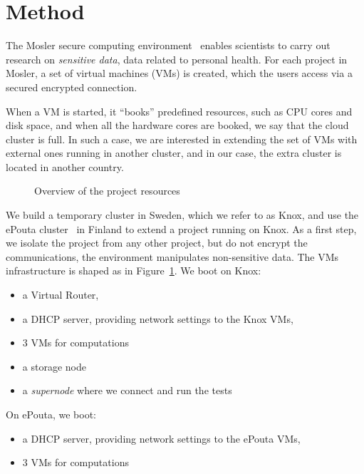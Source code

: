 \section{Method}
\label{section:method}

The Mosler secure computing environment~\cite{mosler} enables
scientists to carry out research on \emph{sensitive data}, \eg data
related to personal health.
%
For each project in Mosler, a set of virtual machines (VMs) is
created, which the users access via a secured encrypted connection.

When a VM is started, it ``books'' predefined resources, such as CPU
cores and disk space, and when all the hardware cores are booked, we
say that the cloud cluster is full. In such a case, we are interested
in extending the set of VMs with external ones running in another
cluster, and in our case, the extra cluster is located in another
country.

\begin{figure}[!b]
  \centering
  
  \caption{Overview of the project resources}
  \label{figure:overview}
\end{figure}

We build a temporary cluster in Sweden, which we refer to as Knox, and
use the ePouta cluster~\cite{epouta} in Finland to extend a project
running on Knox. As a first step, we isolate the project from any
other project, but do not encrypt the communications, \ie the
environment manipulates non-sensitive data.
%
The VMs infrastructure is shaped as in
Figure~\ref{figure:overview}. We boot on Knox:
\begin{itemize}
\item a Virtual Router,
\item a DHCP server, providing network settings to the Knox VMs,
\item 3 VMs for computations
\item a storage node
\item a \emph{supernode} where we connect and run the tests
\end{itemize}
On ePouta, we boot:
\begin{itemize}
\item a DHCP server, providing network settings to the ePouta VMs,
\item 3 VMs for computations
\end{itemize}

